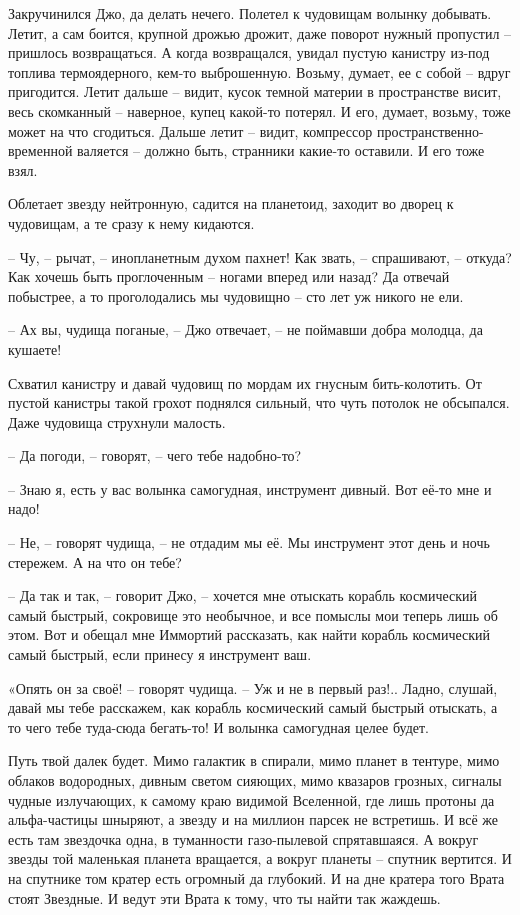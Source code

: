 \documentclass[ebook,oneside,final,openright]{memoir}
\begin{document}
\par
Закручинился Джо, да делать нечего. Полетел к чудовищам волынку добывать. Летит, а сам боится, крупной дрожью дрожит, даже поворот нужный пропустил – пришлось возвращаться. А когда возвращался, увидал пустую канистру из-под топлива термоядерного, кем-то выброшенную. Возьму, думает, ее с собой – вдруг пригодится. Летит дальше – видит, кусок темной материи в пространстве висит, весь скомканный – наверное, купец какой-то потерял. И его, думает, возьму, тоже может на что сгодиться. Дальше летит – видит, компрессор пространственно-временной валяется – должно быть, странники какие-то оставили. И его тоже взял.\par
\par
Облетает звезду нейтронную, садится на планетоид, заходит во дворец к чудовищам, а те сразу к нему кидаются. \par
– Чу, – рычат, – инопланетным духом пахнет! Как звать, – спрашивают, – откуда? Как хочешь быть проглоченным – ногами вперед или назад? Да отвечай побыстрее, а то проголодались мы чудовищно – сто лет уж никого не ели.\par
– Ах вы, чудища поганые, – Джо отвечает, – не поймавши добра молодца, да кушаете! \par
Схватил канистру и давай чудовищ по мордам их гнусным бить-колотить. От пустой канистры такой грохот поднялся сильный, что чуть потолок не обсыпался. Даже чудовища струхнули малость. \par
– Да погоди, – говорят, – чего тебе надобно-то?\par
– Знаю я, есть у вас волынка самогудная, инструмент дивный. Вот её-то мне и надо!\par
– Не, – говорят чудища, – не отдадим мы её. Мы инструмент этот день и ночь стережем. А на что он тебе? \par
– Да так и так, – говорит Джо, – хочется мне отыскать корабль космический самый быстрый, сокровище это необычное, и все помыслы мои теперь лишь об этом. Вот и обещал мне Иммортий рассказать, как найти корабль космический самый быстрый, если принесу я инструмент ваш. \par
\par
«Опять он за своё! – говорят чудища. – Уж и не в первый раз!.. Ладно, слушай, давай мы тебе расскажем, как корабль космический самый быстрый отыскать, а то чего тебе туда-сюда бегать-то! И волынка самогудная целее будет. \par
\par
Путь твой далек будет. Мимо галактик в спирали, мимо планет в тентуре, мимо облаков водородных, дивным светом сияющих, мимо квазаров грозных, сигналы чудные излучающих, к самому краю видимой Вселенной, где лишь протоны да альфа-частицы шныряют, а звезду и на миллион парсек не встретишь. И всё же есть там звездочка одна, в туманности газо-пылевой спрятавшаяся. А вокруг звезды той маленькая планета вращается, а вокруг планеты – спутник вертится. И на спутнике том кратер есть огромный да глубокий. И на дне кратера того Врата стоят Звездные. И ведут эти Врата к тому, что ты найти так жаждешь.\par
\end{document}
